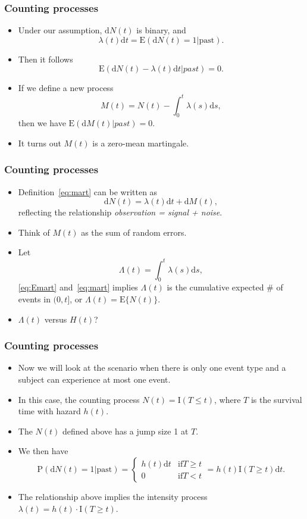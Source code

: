 \documentclass[10pt]{beamer}\usepackage[]{graphicx}\usepackage[]{color}
\newcommand{\dif}{\mathrm{d}}
\newcommand{\dt}{\mathrm{d}t}
\newcommand{\E}{\mathrm{E}}
\newcommand{\I}{\mathrm{I}}
\newcommand{\p}{\mathrm{P}}
\begin{document}
\begin{frame}
  \frametitle{Counting processes}
  \begin{itemize}  
  \item Under our assumption, $\dif N(t)$ is binary, and 
    $$\lambda(t) \dt = \E(\dif N(t) = 1|\mbox{past}).$$
  \item Then it follows
    \begin{equation}
      \label{eq:Emart}
      \E(\dif N(t) - \lambda(t) \dt |past) = 0.
    \end{equation}
  \item If we define a new process 
    \begin{equation}
      \label{eq:mart}
      M(t) = N(t) - \int_0^t\lambda(s) \dif s,
    \end{equation}
    then we have $\E(\dif M(t) | past) = 0$.
  \item It turns out $M(t)$ is a zero-mean martingale.
  \end{itemize}
\end{frame}

\begin{frame}
  \frametitle{Counting processes}
  \begin{itemize}  
  \item Definition~\eqref{eq:mart} can be written as
    $$\dif N(t) = \lambda(t) \dif t + \dif M(t),$$
    reflecting the relationship \emph{observation = signal + noise}.
  \item Think of $M(t)$ as the sum of random errors.
  \item Let 
    $$\Lambda(t) = \int_0^t\lambda(s)\dif s,$$
    \eqref{eq:Emart} and~\eqref{eq:mart} implies $\Lambda(t)$ is the cumulative expected \# of events in $(0, t]$, 
    or $\Lambda(t) = \E\{N(t)\}$.
  \item $\Lambda(t)$ versus $H(t)$?
  \end{itemize}
\end{frame} 

\begin{frame}
  \frametitle{Counting processes}
  \begin{itemize}  
  \item Now we will look at the scenario when there is only one event type and 
    a subject can experience at most one event.
  \item In this case, the counting process $N(t) = \I(T \le t)$, 
    where $T$ is the survival time with hazard $h(t)$.
  \item The $N(t)$ defined above has a jump size 1 at $T$.
  \item We then have
    \begin{equation*}
      \p(\dif N(t) = 1 |\mbox{past}) = \left\{\begin{matrix}
      h(t)\dif t & \mbox{if} T \ge t\\ 
      0 & \mbox{if} T < t
      \end{matrix}\right.
      = h(t)\I(T\ge t) \dif t. 
    \end{equation*}
  \item The relationship above implies the intensity process $\lambda(t) = h(t)\cdot \I(T\ge t)$.
  \end{itemize}
\end{frame} 
\end{document}
